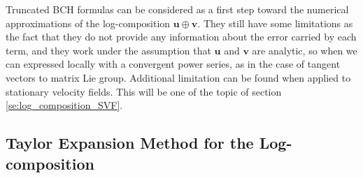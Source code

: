 Truncated BCH formulas can be considered as a first step toward the numerical approximations of the log-composition $\mathbf{u}\oplus \mathbf{v}$. They still have some limitations as the fact that they do not provide any information about the error carried by each term, and they work under the assumption that $\mathbf{u}$ and $\mathbf{v}$ are analytic, so when we can expressed locally with a convergent power series, as in the case of tangent vectors to matrix Lie group. Additional limitation can be found when applied to stationary velocity fields. This will be one of the topic of section \ref{se:log_composition_SVF}.


\subsection{Taylor Expansion Method for the Log-composition}\label{se:taylor_expansion}

